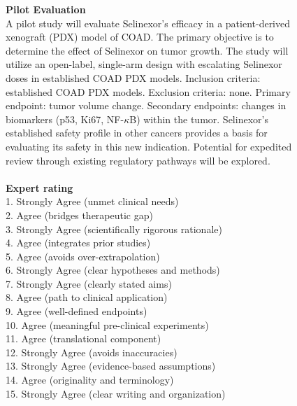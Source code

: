 \begin{figure}[htbp!]
\begin{tcolorbox}[title=Selinexor for colon cancer (continued)]
\textbf{Pilot Evaluation}\\
A pilot study will evaluate Selinexor's efficacy in a patient-derived xenograft (PDX) model of COAD. The primary objective is to determine the effect of Selinexor on tumor growth. The study will utilize an open-label, single-arm design with escalating Selinexor doses in established COAD PDX models. Inclusion criteria: established COAD PDX models. Exclusion criteria: none. Primary endpoint: tumor volume change. Secondary endpoints: changes in biomarkers (p53, Ki67, NF-$\kappa$B) within the tumor. Selinexor's established safety profile in other cancers provides a basis for evaluating its safety in this new indication. Potential for expedited review through existing regulatory pathways will be explored.\\
\\
\textbf{Expert rating}\\
1. Strongly Agree (unmet clinical needs)\\
2. Agree (bridges therapeutic gap)\\
3. Strongly Agree (scientifically rigorous rationale)\\
4. Agree (integrates prior studies)\\
5. Agree (avoids over-extrapolation)\\
6. Strongly Agree (clear hypotheses and methods)\\
7. Strongly Agree (clearly stated aims)\\
8. Agree (path to clinical application)\\
9. Agree (well-defined endpoints)\\
10. Agree (meaningful pre-clinical experiments)\\
11. Agree (translational component)\\
12. Strongly Agree (avoids inaccuracies)\\
13. Strongly Agree (evidence-based assumptions)\\
14. Agree (originality and terminology)\\
15. Strongly Agree (clear writing and organization)\\
\end{tcolorbox}
\end{figure}



